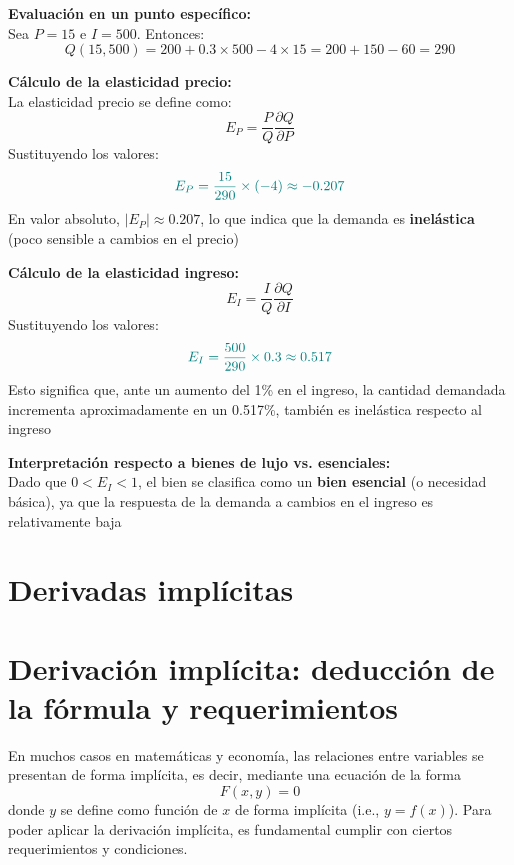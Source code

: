 \documentclass{article}
\begin{document}
\textbf{Evaluación en un punto específico:}\\
Sea \(P = 15\) e \(I = 500\). Entonces:
\[
Q(15, 500) = 200 + 0.3 \times 500 - 4 \times 15 = 200 + 150 - 60 = 290
\]

\textbf{Cálculo de la elasticidad precio:}\\
La elasticidad precio se define como:
\[
E_P = \frac{P}{Q}\frac{\partial Q}{\partial P}
\]
Sustituyendo los valores:
\[
\color{teal}
E_P = \frac{15}{290} \times (-4) \approx -0.207
\]
En valor absoluto, \(\left|E_P\right| \approx 0.207\), lo que indica que la demanda es \textbf{inelástica} (poco sensible a cambios en el precio)

\textbf{Cálculo de la elasticidad ingreso:}
\[
E_I = \frac{I}{Q}\frac{\partial Q}{\partial I}
\]
Sustituyendo los valores:
\[
\color{teal}
E_I = \frac{500}{290} \times 0.3 \approx 0.517
\]
Esto significa que, ante un aumento del 1\% en el ingreso, la cantidad demandada incrementa aproximadamente en un 0.517\%, también es inelástica respecto al ingreso

\textbf{Interpretación respecto a bienes de lujo vs. esenciales:}\\
Dado que \(0 < E_I < 1\), el bien se clasifica como un \textbf{\color{teal}bien esencial} (o necesidad básica), ya que la respuesta de la demanda a cambios en el ingreso es relativamente baja


\newpage

\section{Derivadas implícitas}


\section*{Derivación implícita: deducción de la fórmula y requerimientos}

En muchos casos en matemáticas y economía, las relaciones entre variables se presentan de forma implícita, es decir, mediante una ecuación de la forma
\[
F(x,y) = 0
\]
donde \( y \) se define como función de \( x \) de forma implícita (i.e., \( y = f(x) \)). Para poder aplicar la derivación implícita, es fundamental cumplir con ciertos requerimientos y condiciones.
\end{document}
